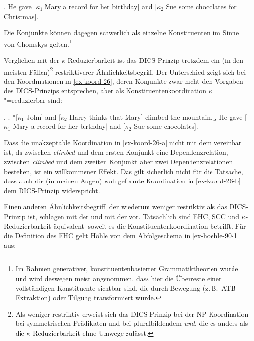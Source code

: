 \ex. \label{ex-hudson88-35} He gave [$\kappa_1$ Mary a record for her birthday] and [$\kappa_2$ Sue some chocolates for Christmas].\hfill \citep[(35)]{Hudson:88}

Die Konjunkte können dagegen schwerlich als einzelne Konstituenten im Sinne von Chomskys  gelten.\footnote{Im Rahmen generativer, konstituentenbasierter Grammatiktheorien wurde und wird deswegen meist angenommen, dass hier die Überreste einer vollständigen Konstituente sichtbar sind, die durch Bewegung (z.\,B.\ ATB-Extraktion) oder Tilgung transformiert wurde.}

Verglichen mit der $\kappa$-Reduzierbarkeit ist das DICS-Prinzip trotzdem ein (in den meisten Fällen)\footnote{Als weniger restriktiv erweist sich das DICS-Prinzip bei der NP-Koordination bei symmetrischen Prädikaten und bei pluralbildendem {\it und}, die es anders als die $\kappa$-Reduzierbarkeit ohne Umwege zulässt.} restriktiverer Ähnlichkeitsbegriff. Der Unterschied zeigt sich bei den Koordinationen in \ref{ex-koord-26}, deren Konjunkte zwar nicht den Vorgaben des DICS-Prinzips entsprechen, aber als Konstituentenkoordination $\kappa$"=reduzierbar sind:

\ex. \label{ex-koord-26}
\a. *[$\kappa_1$ John] and [$\kappa_2$ Harry thinks that Mary] climbed the mountain. \hfill \citep[(47a)]{Pickering:Barry:93}\label{ex-koord-26-a}
\b. He gave [$\kappa_1$ Mary a record for her birthday] and [$\kappa_2$ Sue some chocolates].\label{ex-koord-26-b} 

Dass die unakzeptable Koordination in \ref{ex-koord-26-a} nicht mit dem  vereinbar ist, da zwischen {\it climbed} und dem ersten Konjunkt eine Dependenzrelation, zwischen {\it climbed} und dem zweiten Konjunkt aber zwei Dependenzrelationen bestehen, ist ein willkommener Effekt. Das gilt sicherlich nicht für die Tatsache, dass auch die (in meinen Augen) wohlgeformte Koordination in \ref{ex-koord-26-b} dem DICS-Prinzip widerspricht. 

Einen anderen Ähnlichkeitsbegriff, der wiederum weniger restriktiv als das DICS-Prinzip ist, schlagen \cite{Hoehle:90,Hoehle:91} mit der  und \citet[305]{Kathol:99} mit der  vor. Tatsächlich sind EHC, SCC und $\kappa$-Reduzierbarkeit äquivalent, soweit es die Konstituentenkoordination betrifft. Für die Definition des EHC geht Höhle von dem Abfolgeschema in \ref{ex-hoehle-90-1} aus:\largerpage%

